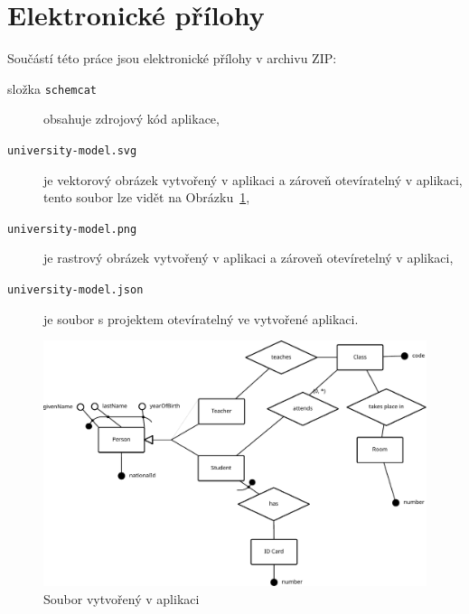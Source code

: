 \documentclass[12pt,a4paper]{report}
\makeatletter
\let\openright=\clearpage
\def\maxwidth#1{\ifdim\Gin@nat@width>#1 #1\else\Gin@nat@width\fi}
\makeatother
\begin{document}
\section{Elektronické přílohy}\label{appendix:electronic}
Součástí této práce jsou elektronické přílohy v archivu ZIP:
\begin{description}
  \item[složka \texttt{schemcat}] obsahuje zdrojový kód aplikace,
  \item[\texttt{university-model.svg}] je vektorový obrázek vytvořený v aplikaci a zároveň otevíratelný v aplikaci, tento soubor lze vidět na Obrázku~\ref{fig:university-model},
  \item[\texttt{university-model.png}] je rastrový obrázek vytvořený v aplikaci a zároveň otevíretelný v aplikaci,
  \item[\texttt{university-model.json}] je soubor s projektem otevíratelný ve vytvořené aplikaci.
\end{description}
\begin{figure}[!htb]
  \centering
  \includegraphics[width=\maxwidth{\textwidth}]{../img/university-model.pdf} 
  \caption{Soubor vytvořený v aplikaci}
  \label{fig:university-model}
\end{figure}

\openright
\end{document}
